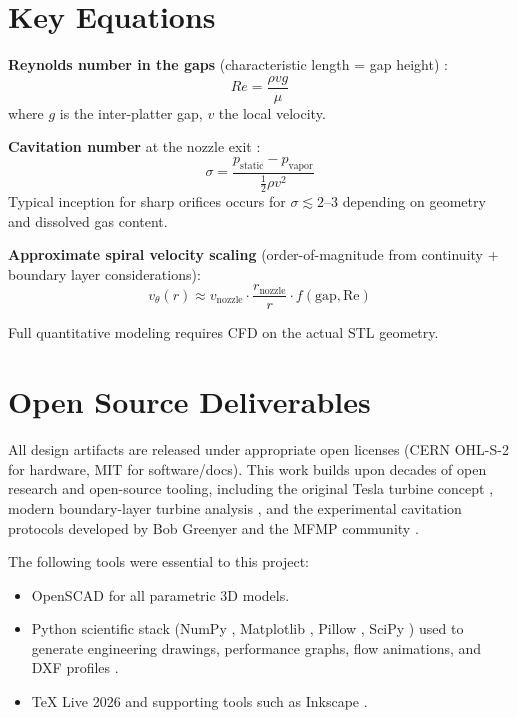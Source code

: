 \documentclass[11pt,a4paper]{article}
\begin{document}
\section{Key Equations}

\textbf{Reynolds number in the gaps} (characteristic length = gap height) \cite{brennen1995}:
\[
Re = \frac{\rho v g}{\mu}
\]
where $g$ is the inter-platter gap, $v$ the local velocity.

\textbf{Cavitation number} at the nozzle exit \cite{brennen1995,franc2004}:
\[
\sigma = \frac{p_\text{static} - p_\text{vapor}}{\frac{1}{2}\rho v^2}
\]
Typical inception for sharp orifices occurs for $\sigma \lesssim 2$--3 depending on geometry and dissolved gas content.

\textbf{Approximate spiral velocity scaling} (order-of-magnitude from continuity + boundary layer considerations):
\[
v_\theta(r) \approx v_\text{nozzle} \cdot \frac{r_\text{nozzle}}{r} \cdot f(\text{gap}, \text{Re})
\]

Full quantitative modeling requires CFD on the actual STL geometry.

\section{Open Source Deliverables}

All design artifacts are released under appropriate open licenses (CERN OHL-S-2 for hardware, MIT for software/docs). This work builds upon decades of open research and open-source tooling, including the original Tesla turbine concept \cite{tesla1913}, modern boundary-layer turbine analysis \cite{rice1965,sengupta2016}, and the experimental cavitation protocols developed by Bob Greenyer and the MFMP community \cite{greenyer2020,greenyer2026}.

The following tools were essential to this project:
\begin{itemize}
    \item OpenSCAD \cite{openscad2025} for all parametric 3D models.
    \item Python scientific stack (NumPy \cite{numpy2025}, Matplotlib \cite{matplotlib2025}, Pillow \cite{pillow2025}, SciPy \cite{scipy2025}) used to generate engineering drawings, performance graphs, flow animations, and DXF profiles \cite{flow_conditioner_generators2026}.
    \item \TeX{} Live 2026 \cite{texlive2026} and supporting tools such as Inkscape \cite{inkscape2025}.
\end{itemize}
\end{document}
